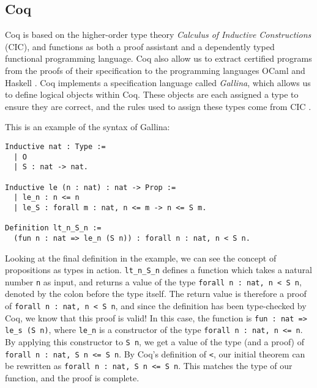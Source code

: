 \subsection{Coq}
\label{ssec:coq}

Coq is based on the higher-order type theory \emph{Calculus of Inductive Constructions} (CIC), and
functions as both a proof assistant and a dependently typed functional programming language.
Coq also allow us to extract certified programs from the proofs of their specification to
the programming languages OCaml and Haskell \cite{cintro}.
Coq implements a specification language called \emph{Gallina},
which allows us to define logical objects within Coq.
These objects are each assigned a type to ensure they are correct,
and the rules used to assign these types come from CIC \cite{cic}.

This is an example of the syntax of Gallina:

\begin{minipage}{\linewidth}
\begin{lstlisting}[language=Coq, label={lst:gallina_ex}, caption={Example of Gallina syntax}]
Inductive nat : Type :=
  | O
  | S : nat -> nat.

Inductive le (n : nat) : nat -> Prop :=
  | le_n : n <= n
  | le_S : forall m : nat, n <= m -> n <= S m.

Definition lt_n_S_n :=
  (fun n : nat => le_n (S n)) : forall n : nat, n < S n.
\end{lstlisting}
\end{minipage}

Looking at the final definition in the example, we can see the
concept of propositions as types in action.
\lstinline{lt_n_S_n} defines a function which takes a natural number \lstinline{n}
as input, and returns a value of the type \lstinline{forall n : nat, n < S n},
denoted by the colon before the type itself.
The return value is therefore a proof of \lstinline{forall n : nat, n < S n}, and since
the definition has been type-checked by Coq, we know that this proof is valid!
In this case, the function is
\lstinline{fun : nat => le_s (S n)}, where \lstinline{le_n} is a constructor
of the type \lstinline{forall n : nat, n <= n}. By applying this constructor
to \lstinline{S n}, we get a value of the type (and a proof) of
\lstinline{forall n : nat, S n <= S n}.
By Coq's definition of \lstinline{<},
our initial theorem can be rewritten as \lstinline{forall n : nat, S n <= S n}.
This matches the type of our function, and the proof is complete.

